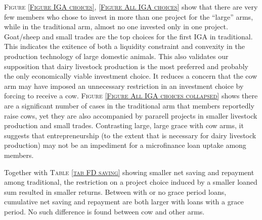 \begin{palepinkleftbar}
\begin{finding}
\textsc{\small Figure \ref{Figure IGA choices}, \ref{Figure All IGA choices}} show that there are very few members who chose to invest in more than one project for the ``large'' arms, while in the \textsf{traditional} arm, almost no one invested only in one project. Goat/sheep and small trades are the top choices for the first IGA in \textsf{traditional}. This indicates the exitence of both a liquidity constraint and convexity in the production technology of large domestic animals. This also validates our supposition that dairy livestock production is the most preferred and probably the only economically viable investment choice. It reduces a concern that the \textsf{cow} arm may have imposed an unnecessary restriction in an investment choice by forcing to receive a cow. \textsc{\small Figure \ref{Figure All IGA choices collapsed}} shows there are a significant number of cases in the \textsf{traditional} arm that members reportedly raise cows, yet they are also accompanied by pararell projects in smaller livestock production and small trades. Contrasting \textsf{large}, \textsf{large grace} with \textsf{cow} arms, it suggests that entrepreneurship (to the extent that is necessary for dairy livestock production) may not be an impediment for a microfinance loan uptake among members.
\end{finding}
\end{palepinkleftbar}

Together with \textsc{\small Table \ref{tab FD saving}} showing smaller net saving and repayment among \textsf{traditional}, the restriction on a project choice induced by a smaller loaned sum resulted in smaller returns. Between with or no grace period loans, cumulative net saving and repayment are both larger with loans with a grace period. No such difference is found between \textsf{cow} and other arms.



